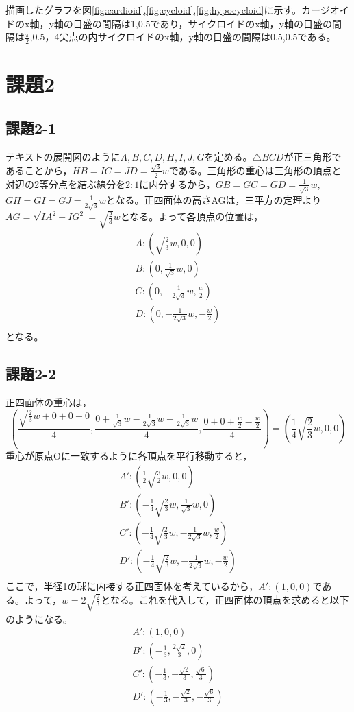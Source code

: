 \documentclass[]{jsarticle}
\begin{document}
描画したグラフを図\ref{fig:cardioid},\ref{fig:cycloid},\ref{fig:hypocycloid}に示す。カージオイドのx軸，y軸の目盛の間隔は1,0.5であり，サイクロイドのx軸，y軸の目盛の間隔は$\frac{\pi}{2}$,0.5，4尖点の内サイクロイドのx軸，y軸の目盛の間隔は0.5,0.5である。

\section{課題2}
\subsection{課題2-1}
テキストの展開図のように$A,B,C,D,H,I,J,G$を定める。$\triangle BCD$が正三角形であることから，$HB=IC=JD=\frac{\sqrt{3}}{2}w$である。三角形の重心は三角形の頂点と対辺の2等分点を結ぶ線分を$2:1$に内分するから，$GB=GC=GD=\frac{1}{\sqrt{3}}w$,$GH=GI=GJ=\frac{1}{2\sqrt{3}}w$となる。正四面体の高さAGは，三平方の定理より$AG=\sqrt{IA^2-IG^2}=\sqrt{\frac{2}{3}}w$となる。よって各頂点の位置は，
\begin{eqnarray*}
A:(\sqrt{\frac{2}{3}}w,0,0)\\
B:(0,\frac{1}{\sqrt{3}}w,0)\\
C:(0,-\frac{1}{2\sqrt{3}}w,\frac{w}{2})\\
D:(0,-\frac{1}{2\sqrt{3}}w,-\frac{w}{2})\\
\end{eqnarray*}
となる。

\subsection{課題2-2}
正四面体の重心は，
$$
\left( \frac{\sqrt{\frac{2}{3}}w+0+0+0}{4},\frac{0+\frac{1}{\sqrt{3}}w-\frac{1}{2\sqrt{3}}w-\frac{1}{2\sqrt{3}}w}{4},\frac{0+0+\frac{w}{2}-\frac{w}{2}}{4}\right)=\left(\frac{1}{4}\sqrt{\frac{2}{3}}w,0,0\right)
$$
重心が原点Oに一致するように各頂点を平行移動すると，
\begin{eqnarray*}
A':(\frac{1}{2}\sqrt{\frac{3}{2}}w,0,0)\\
B':(-\frac{1}{4}\sqrt{\frac{2}{3}}w,\frac{1}{\sqrt{3}}w,0)\\
C':(-\frac{1}{4}\sqrt{\frac{2}{3}}w,-\frac{1}{2\sqrt{3}}w,\frac{w}{2})\\
D':(-\frac{1}{4}\sqrt{\frac{2}{3}}w,-\frac{1}{2\sqrt{3}}w,-\frac{w}{2})\\
\end{eqnarray*}
ここで，半径1の球に内接する正四面体を考えているから，$A':(1,0,0)$である。よって，$w=2\sqrt{\frac{2}{3}}$となる。これを代入して，正四面体の頂点を求めると以下のようになる。
\begin{eqnarray*}
A':(1,0,0)\\
B':(-\frac{1}{3},\frac{2\sqrt{2}}{3},0)\\
C':(-\frac{1}{3},-\frac{\sqrt{2}}{3},\frac{\sqrt{6}}{3})\\
D':(-\frac{1}{3},-\frac{\sqrt{2}}{3},-\frac{\sqrt{6}}{3})
\end{eqnarray*}
\end{document}
